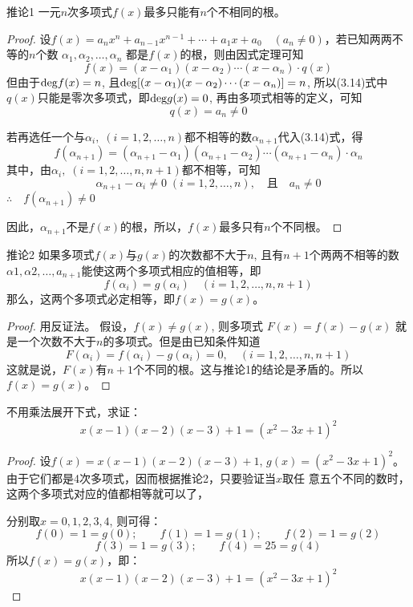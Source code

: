 \begin{blk}{推论1}
    一元$n$次多项式$f(x)$最多只能有$n$个不相同的根。
\end{blk}

\begin{proof}
设$f(x)=a_nx^n+a_{n-1}x^{n-1}+\cdots+a_1x+a_0\quad (a_n\ne 0)$，若已知两两不等的$n$个数
$\alpha_1, \alpha_2, \ldots, \alpha_n$
都是$f(x)$的根，则由因式定理可知
\begin{equation}
    f (x) = (x-\alpha_1) (x-\alpha_2)\cdots (x-\alpha_n)\cdot q(x)
\end{equation}
但由于${\rm deg}f(x)=n$, 且${\rm deg}[(x-\alpha_1)(x-\alpha_2)\cdots(x-\alpha_n)]=n$, 所以(3.14)式中$q(x)$只能是零次多项式，即${\rm deg}g(x)=0$, 再由多项式相等的定义，可知
\[q (x) =a_n\ne 0\]

若再选任一个与$\alpha_i,\; (i=1, 2,\ldots,n)$都不相等的数$\alpha_{n+1}$代入(3.14)式，得
\[f(\alpha_{n+1})=(\alpha_{n+1}-\alpha_{1})(\alpha_{n+1}-\alpha_2)\cdots (\alpha_{n+1}-\alpha_n)\cdot \alpha_n\]
其中，由$\alpha_i,\; (i=1, 2,\ldots,n,n+1)$都不相等，可知
\[\alpha_{n+1}-\alpha_i\ne 0\;  (i=1, 2,\ldots,n),\quad \text{且}\quad a_n\ne 0\]
$\therefore\quad f(\alpha_{n+1}) \ne 0$

因此，$\alpha_{n+1}$不是$f(x)$的根，所以，$f(x)$最多只有$n$个不同根。
\end{proof}

\begin{blk}{推论2}
如果多项式$f(x)$与$g(x)$的次数都不大于$n$, 且有$n+1$个两两不相等的数$\alpha1,\alpha2,\ldots,a_{n+1}$能使这两个多项式相应的值相等，即   
\[f(\alpha_i)=g(\alpha_i)\quad (i=1,2,\ldots,n,n+1)\]
 那么，这两个多项式必定相等，即$f(x)=g(x)$。
\end{blk}

\begin{proof}用反证法。
假设，$f(x)\ne g(x)$, 则多项式
$F (x) =f (x) -g (x)$
就是一个次数不大于$n$的多项式。但是由已知条件知道
\[F (\alpha_i) =f (\alpha_i) -g (\alpha_i)=0,\quad  (i=1,2,\ldots,n,n+1)\]
这就是说，$F(x)$有$n+1$个不同的根。这与推论1的结论是矛盾的。所以
$f (x) =g (x)$。
\end{proof}

\begin{example}
    不用乘法展开下式，求证：
\[x(x-1) (x-2)(x-3)+1=(x^2-3x+1)^2\]
\end{example}

\begin{proof}
    设$f(x)=x(x-1)(x-2)(x-3)+1$, $
g (x) = (x^2-3x+1)^2$。
由于它们都是4次多项式，因而根据推论2，只要验证当$x$取任    
意五个不同的数时，这两个多项式对应的值都相等就可以了，

分别取$x=0, 1, 2, 3, 4$, 则可得：
\[f (0) =1=g (0);\qquad f (1) =1=g (1) ;\qquad f (2) =1=g (2)\]
\[ f (3) =1=g (3) ;\qquad f (4) =25=g (4) \]
所以$f (x) =g (x) $，即：
\[x (x-1) (x-2) (x-3)+1=(x^2-3x+1)^2\]
\end{proof}


